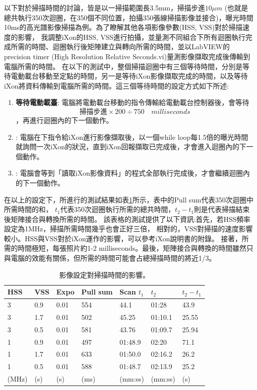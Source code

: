 \documentclass[12pt]{article}
\begin{document}
以下對於掃描時間的討論，皆是以一掃描範圍長3.5mm，掃描步進$10\mu m$ (也就是總共執行350次迴圈，在350個不同位置，拍攝350張線掃描影像並接合)，曝光時間10ms的高光譜影像掃描為例。為了瞭解其他各項影像參數(HSS, VSS)對於掃描速度的影響，
我調整iXon的HSS, VSS進行拍攝，並量測不同組合下所有迴圈執行完成所需的時間、迴圈執行後矩陣建立與轉向所需的時間，並以LabVIEW的precision timer (High Resolution Relative Seconds.vi)量測影像擷取完成後傳輸到電腦所需的時間。
在以下的測試中，整個掃描迴圈中有三個等待時間，分別是等待電動載台移動至定點的時間，另一是等待iXon影像擷取完成的時間，以及等待iXon將資料傳輸到電腦所需的時間。這三個等待時間的設定方式如下所述:
\begin{enumerate}
    \item \textbf{\CJKsans 等待電動載臺}: 電腦將電動載台移動的指令傳輸給電動載台控制器後，會等待\begin{equation} \label{eq: stageWait}
              \text{掃描步進}\times 200 \div 750 \quad milliseconds
          \end{equation}，再進行迴圈內的下一個動作。
    \item \textbf{}: 電腦在下指令給iXon進行影像擷取後，以一個while loop每1.5倍的曝光時間就詢問一次iXon的狀況，直到iXon回報擷取已完成後，才會進入迴圈內的下一個動作。
    \item \textbf{}: 電腦會等到「讀取iXon影像資料」的程式全部執行完成後，才會繼續迴圈內的下一個動作。
\end{enumerate}
在以上的設定下，所進行的測試結果如表\ref{tab: measuring}所示，表中的Pull sum代表350次迴圈中\textbf{}所需時間的和，
$t_1$代表350次迴圈執行所需的總共時間，$t_2-t_1$則是代表掃描結束後矩陣接合與轉換所需的時間。
該表格的測試提供了以下資訊:首先，若HSS頻率設定為1MHz，掃描所需時間幾乎也會正好三倍，
相對的，VSS對掃描的速度影響較小。HSS與VSS對於iXon運作的影響，可以參考iXon說明書的附錄。\cite{ixonManual}
接著，\textbf{}所需的時間極短，每張照片約1-2 milliseconds。最後，矩陣接合與轉換的時間雖然只與電腦的效能有關係，但所需的時間可能會占總掃描時間的將近1/3。
\begin{table}[]
    \centering
    \begin{tabular}{lll||llll}
        HSS   & VSS & Expo & Pull sum & Scan $t_1$ & $t_2$   & $t_2-t_1$ \\ \hline \hline
        3     & 0.9 & 0.01 & 554      & 44.1       & 01:28   & 43.9      \\ \hline
        3     & 1.7 & 0.01 & 502      & 45.25      & 01:10.1 & 25.55     \\ \hline
        3     & 0.5 & 0.01 & 581      & 43.76      & 01:09.7 & 25.94     \\ \hline
        1     & 0.9 & 0.01 & 497      & 01:48.9    & 02:20   & 71.1      \\ \hline
        1     & 1.7 & 0.01 & 633      & 01:50.0    & 02:16.2 & 26.2      \\ \hline
        1     & 0.5 & 0.01 & 588      & 01:48.7    & 02:13.9 & 25.2      \\
        (MHz) & (s) & (s)  & (ms)     & (mm:ss)    & (mm:ss) & (s)
    \end{tabular}
    \caption{影像設定對掃描時間的影響。}
    \label{tab: measuring}
\end{table}
\end{document}
